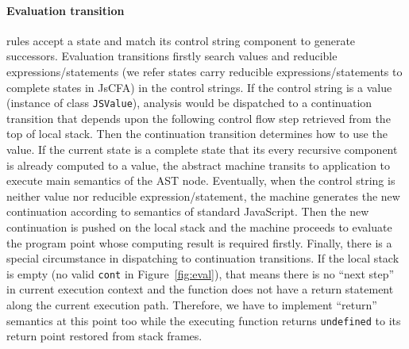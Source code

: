 \documentclass{article}
\begin{document}
\paragraph{Evaluation transition}rules accept a state and match its control string component to generate successors. Evaluation transitions firstly search values and reducible expressions/statements (we refer states carry reducible expressions/statements to complete states in JsCFA) in the control strings.
If the control string is a value (instance of class \verb|JSValue|), analysis would be dispatched to a continuation transition that depends upon  the following control flow step retrieved from the top of local stack. Then the continuation transition determines how to use the value.
If the current state is a complete state that its every recursive component is already computed to a value, the abstract machine transits to application to execute main semantics of the AST node.
Eventually, when the control string is neither value nor reducible expression/statement, the machine generates the new continuation according to semantics of standard JavaScript.
Then the new continuation is pushed on the local stack and the machine proceeds to evaluate the program point whose computing result is required firstly.
Finally, there is a special circumstance in dispatching to continuation transitions. If the local stack is empty (no valid \verb|cont| in Figure~\ref{fig:eval}), that means there is no ``next step'' in current execution context and the function does not have a return statement along the current execution path.
Therefore, we have to implement ``return'' semantics at this point too while the executing function returns \verb|undefined| to its return point restored from stack frames.
\end{document}
